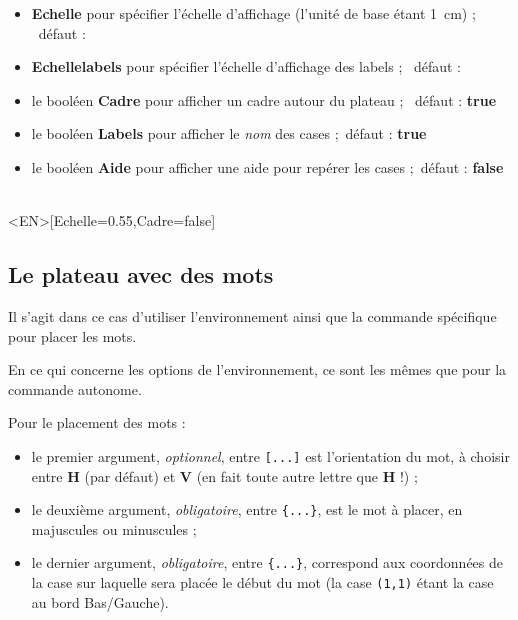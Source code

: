 \documentclass{article}
\newcommand\Cle[1]{{\bfseries\sffamily\textlangle #1\textrangle}}
\begin{document}
\begin{itemize}
	\item \Cle{Echelle} pour spécifier l'échelle d'affichage (l'unité de base étant 1~cm) ; \hfill~défaut : \Cle{1}
	\item \Cle{Echellelabels} pour spécifier l'échelle d'affichage des labels ; \hfill~défaut : \Cle{1}
	\item le booléen \Cle{Cadre} pour afficher un cadre autour du plateau ; \hfill~défaut : \Cle{true}
	\item le booléen \Cle{Labels} pour afficher le \textit{nom} des cases ;\hfill~défaut : \Cle{true}
	\item le booléen \Cle{Aide} pour afficher une aide pour repérer les cases ;\hfill~défaut : \Cle{false}
\end{itemize}

\begin{PresentationCode}{}
\PlateauScrabble[Labels=false,Echelle=0.55]\\     %
\PlateauScrabble<EN>[Echelle=0.55,Cadre=false]    %
\end{PresentationCode}

\newpage

\subsection{Le plateau avec des mots}

Il s'agit dans ce cas d'utiliser l'\textsf{environnement} ainsi que la \textsf{commande} spécifique pour placer les mots.

\smallskip

En ce qui concerne les options de l'\textsf{environnement}, ce sont les mêmes que pour la \textsf{commande} autonome.

\smallskip

Pour le placement des mots :

\begin{itemize}
	\item le premier argument, \textit{optionnel}, entre \texttt{[...]} est l'orientation du mot, à choisir entre \Cle{H} (par défaut) et \Cle{V} (en fait toute autre lettre que \Cle{H} !) ;
	\item le deuxième argument, \textit{obligatoire}, entre \texttt{\{...\}}, est le mot à placer, en majuscules ou minuscules ;
	\item le dernier argument, \textit{obligatoire}, entre \texttt{\{...\}}, correspond aux coordonnées de la case sur laquelle sera placée le début du mot (la case \texttt{(1,1)} étant la case au bord Bas/Gauche).
\end{itemize}
\end{document}

